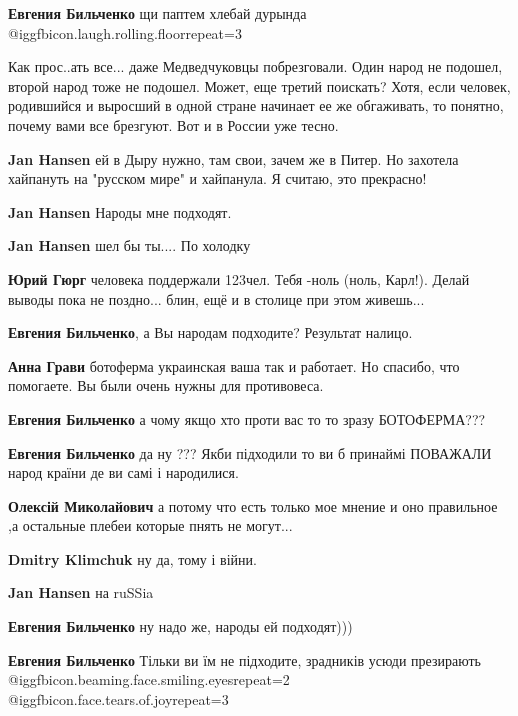 \begin{itemize}
\begin{itemize}
\textbf{Евгения Бильченко} щи паптем хлебай дурында @igg{fbicon.laugh.rolling.floor}{repeat=3} 
\end{itemize} %


Как прос..ать все... даже Медведчуковцы побрезговали. Один народ не подошел,
второй народ тоже не подошел. Может, еще третий поискать? Хотя, если человек,
родившийся и выросший в одной стране начинает ее же обгаживать, то понятно,
почему вами все брезгуют. Вот и в России уже тесно.

\begin{itemize} %
\textbf{Jan Hansen} ей в Дыру нужно, там свои, зачем же в Питер. Но захотела хайпануть на "русском мире" и хайпанула. Я считаю, это прекрасно!


\textbf{Jan Hansen} Народы мне подходят.

\textbf{Jan Hansen} шел бы ты.... По холодку

\textbf{Юрий Гюрг} человека поддержали 123чел. Тебя -ноль (ноль, Карл!). Делай выводы пока не поздно... блин, ещё и в столице при этом живешь...

\textbf{Евгения Бильченко}, а Вы народам подходите? Результат налицо.

\textbf{Анна Грави} ботоферма украинская ваша так и работает. Но спасибо, что помогаете. Вы были очень нужны для противовеса.

\textbf{Евгения Бильченко} а чому якщо хто проти вас то то зразу БОТОФЕРМА???

\textbf{Евгения Бильченко} да ну ??? Якби підходили то ви б принаймі ПОВАЖАЛИ народ країни де ви самі і народилися.

\textbf{Олексій Миколайович} а потому что есть только мое мнение и оно правильное ,а остальные плебеи которые пнять не могут...

\textbf{Dmitry Klimchuk} ну да, тому і війни.

\textbf{Jan Hansen} на ruSSia

\textbf{Евгения Бильченко} ну надо же, народы ей подходят)))

\textbf{Евгения Бильченко} Тільки ви їм не підходите, зрадників усюди презирають @igg{fbicon.beaming.face.smiling.eyes}{repeat=2}  @igg{fbicon.face.tears.of.joy}{repeat=3} 
\end{itemize} %


\end{itemize}
